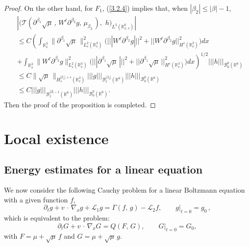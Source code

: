 \documentclass{amsart}[12pt, article]
\begin{document}
\begin{proof}
On the other hand, for $F_1$, (\ref{3.2.4}) implies that, when $ |\beta_2|\leq
|\beta|- 1$,
\begin{align*}
& \left|\Big({{\mathcal T}}(\partial^{\beta_1} \sqrt\mu\,,\, W^\ell
\partial^{\beta_2} g,\, \mu_{\beta_3}\,)
,\,\, h\Big)_{L^2({{{\mathbb R}}}^6_{x, v})}\right|\\
&\leq C \left(\int_{{{{\mathbb R}}}^3_x} \|\partial^{\beta_1}
\sqrt\mu\,\|^2_{L^2_s({{{\mathbb R}}}^3_v)} \Big(|||W^\ell
 \partial^{\beta_2} g|||^2+||W^\ell
 \partial^{\beta_2} g||^2_{H^s({{{\mathbb R}}}^3_v)}\Big)dx\right.\\
&+ \left.\int_{{{{\mathbb R}}}^3_x}\|W^\ell \partial^{\beta_2}
g\|^2_{L^2_s({{{\mathbb R}}}^3_v)} \Big(|||
\partial^{\beta_1} \sqrt\mu\,|||^2+||
\partial^{\beta_1} \sqrt\mu\,||^2_{H^s({{{\mathbb R}}}^3_v)}\Big)
dx\right)^{1/2}|||h|||_{{{\mathcal B}}^0_0({{{\mathbb R}}}^6)} \\
&\leq C \| \sqrt\mu\,\|_{H^{|\beta_1|+s}_s({{{\mathbb R}}}^3_v)}
|||g|||_{{{\mathcal B}}^{|\beta_2|}_\ell({{{\mathbb R}}}^6)} |||h|||_{{{\mathcal B}}^0_0({{{\mathbb R}}}^6)}\\
&\leq C |||g|||_{{{\mathcal B}}^{|\beta|-1}_\ell({{{\mathbb R}}}^6)}
|||h|||_{{{\mathcal B}}^0_0({{{\mathbb R}}}^6)}.
\end{align*}
Then the proof of the proposition is completed.
\end{proof}

\section{Local existence}\label{section4}
\smallbreak

\subsection{Energy estimates for a linear equation}\label{section4.0}
\setcounter{equation}{0} \smallbreak We now consider the following
Cauchy problem for a linear Boltzmann equation with a given
function $f$,
\begin{equation}\label{4.0.1}
\partial_t g + v\,\cdot\,\nabla_x g + {{\mathcal L}}_1 g = \Gamma (f,\,g) -{{\mathcal L}}_2 f
,\qquad g|_{t=0} = g_0\,,
\end{equation}
which is equivalent to the problem:
\begin{equation*}
\partial_t G + v\,\cdot\,\nabla_x G=
Q(F,\,G) ,\qquad G|_{t=0} = G_0,
\end{equation*}
with $F=\mu+\sqrt\mu\,f$ and $G=\mu+\sqrt\mu\,g$.
\end{document}
